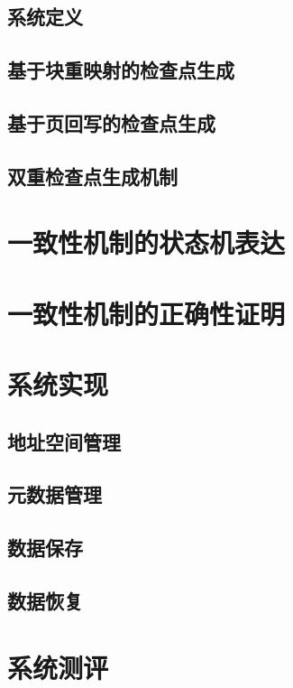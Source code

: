 \subsection{系统定义}

\subsection{基于块重映射的检查点生成}

\subsection{基于页回写的检查点生成}

\subsection{双重检查点生成机制}

\section{一致性机制的状态机表达}

\section{一致性机制的正确性证明}

\section{系统实现}

\subsection{地址空间管理}

\subsection{元数据管理}

\subsection{数据保存}

\subsection{数据恢复}

\section{系统测评}

